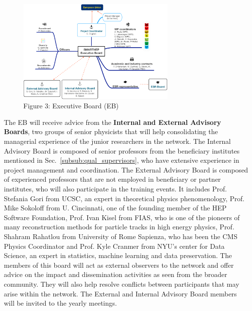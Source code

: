 \begin{figure}
\begin{center}
\includegraphics[width=0.7\textwidth]{figs/SMARTHEP_Boards.png} %
\caption*{Figure 3: \acronym Executive Board (EB)}
\label{fig:management}
\end{center}
\vspace{-5mm}
\end{figure}

The EB will receive advice from the \textbf{Internal and External Advisory Boards}, two groups of senior physicists that will help consolidating the managerial experience of the junior researchers in the network. 
The Internal Advisory Board is composed of senior professors from the beneficiary institutes mentioned in Sec.~\ref{subsub:qual_supervisors}, who have extensive experience in project management and coordination. 
The External Advisory Board is composed of experienced professors that are not employed in beneficiary or partner institutes, who will also participate in the training events. 
It includes Prof. Stefania Gori from UCSC, an expert in theoretical physics phenomenology, Prof. Mike Sokoloff from U. Cincinnati, one of the founding member of the HEP Software Foundation, Prof. Ivan Kisel from FIAS, who is one of the pioneers of many reconstruction methods for particle tracks in high energy physics, Prof. Shahram Rahatlou from University of Rome Sapienza, who has been the CMS Physics Coordinator and Prof. Kyle Cranmer from NYU's center for Data Science, an expert in statistics, machine learning and data preservation. 
The members of this board will act as external observers to the network and offer advice on the impact and dissemination activities as seen from the broader community. 
They will also help resolve conflicts between participants that may arise within the network.
The External and Internal Advisory Board members will be invited to the \acronym yearly meetings. 

